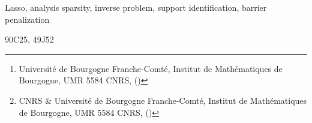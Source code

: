\documentclass[hidelinks]{siamart0216}
\title{{\TheTitle}}
\author{A. Barbara%
  \thanks{Universit\'e de Bourgogne Franche-Comt\'e, Institut de Math\'ematiques de Bourgogne, UMR 5584 CNRS, (\email{\{barbara,jourani\}@u-bourgogne.fr})}%
  \and
  A. Jourani%
  \footnotemark[1]%
  \and
  S. Vaiter%
  \thanks{CNRS \& Universit\'e de Bourgogne Franche-Comt\'e, Institut de Math\'ematiques de Bourgogne, UMR 5584 CNRS, (\email{vaiter@u-bourgogne.fr})}
}
\begin{document}
\maketitle

\begin{abstract}
  This paper deals with the non-uniqueness of the solutions of an analysis-Lasso regularization.
  Most of previous works in this area is concerned with the case where the solution set is a singleton, or to derive guarantees to enforce uniqueness.
  Our main contribution consists in providing a geometrical interpretation of a solution with a maximal $D$-support, namely the fact that such a solution lives in the relative interior of the solution set.
  With this result in hand, we also provide a way to exhibit a maximal solution using a primal-dual interior point algorithm.
\end{abstract}

\begin{keywords}
  Lasso, analysis sparsity,  inverse problem, support identification, barrier penalization
\end{keywords}

\begin{AMS}
  90C25, %
  49J52  %
\end{AMS}










\end{document}
